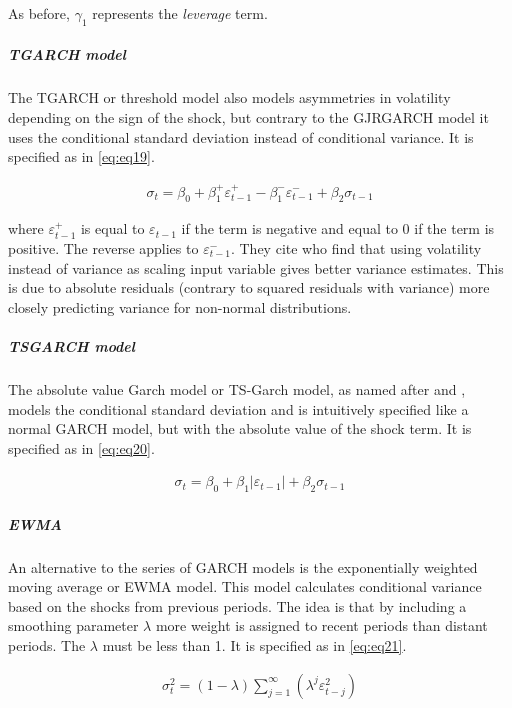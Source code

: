 \documentclass[a4paper, nobind]{templates/ociamthesis}
\begin{document}
As before, \(\gamma_1\) represents the \emph{leverage} term.

\hypertarget{tgarch-model}{%
\subparagraph{TGARCH model}\label{tgarch-model}}

\noindent The TGARCH or threshold model \autocite{zakoian1994} also models asymmetries in volatility depending on the sign of the shock, but contrary to the GJRGARCH model it uses the conditional standard deviation instead of conditional variance. It is specified as in \eqref{eq:eq19}.

\begin{align}
\sigma_t = \beta_0 + \beta_1^+ \varepsilon_{t-1}^+ - \beta_1^{-} \varepsilon_{t-1}^{-} + \beta_2 \sigma_{t-1}
 \label{eq:eq19}
\end{align}

\noindent where \(\varepsilon_{t-1}^+\) is equal to \(\varepsilon_{t-1}\) if the term is negative and equal to 0 if the term is positive. The reverse applies to \(\varepsilon_{t-1}^-\). They cite \textcite{davidian1987} who find that using volatility instead of variance as scaling input variable gives better variance estimates. This is due to absolute residuals (contrary to squared residuals with variance) more closely predicting variance for non-normal distributions.

\hypertarget{tsgarch-model}{%
\subparagraph{TSGARCH model}\label{tsgarch-model}}

\noindent The absolute value Garch model or TS-Garch model, as named after \textcite{taylor1986} and \textcite{schwert1989}, models the conditional standard deviation and is intuitively specified like a normal GARCH model, but with the absolute value of the shock term. It is specified as in \eqref{eq:eq20}.

\begin{align}
\sigma_t = \beta_0 + \beta_1 \left|\varepsilon_{t-1}\right| + \beta_2 \sigma_{t-1}
 \label{eq:eq20}
\end{align}

\hypertarget{ewma}{%
\subparagraph{EWMA}\label{ewma}}

\noindent An alternative to the series of GARCH models is the exponentially weighted moving average or EWMA model. This model calculates conditional variance based on the shocks from previous periods. The idea is that by including a smoothing parameter \(\lambda\) more weight is assigned to recent periods than distant periods. The \(\lambda\) must be less than 1. It is specified as in \eqref{eq:eq21}.

\begin{align}
\sigma_t^2 = (1-\lambda) \sum\limits_{j=1}^\infty (\lambda^j \varepsilon_{t-j}^2)
 \label{eq:eq21}
\end{align}
\end{document}
